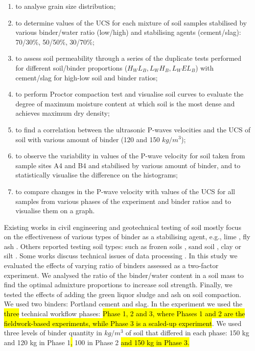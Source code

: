 \documentclass{amestyle}
\begin{document}
\begin{enumerate}
   \item to analyse grain size distribution;
   \item to determine values of the UCS for each mixture of soil samples stabilised by various binder/water ratio (low/high) and stabilising agents (cement/slag): 70/30\%, 50/50\%, 30/70\%; 
  \item to assess soil permeability through a series of the duplicate tests performed for different soil/binder proportions ($H_WL_B,L_WH_B,L_WEL_B$) with cement/slag for high-low soil and binder ratios;
  \item to perform Proctor compaction test and visualise soil curves to evaluate the degree of maximum moisture content at which soil is the most dense and achieves maximum dry density;
  \item to find a correlation between the ultrasonic P-waves velocities and the UCS of soil with various amount of binder (120 and 150 $kg/m^3$);
  \item to observe the variability in values of the P-wave velocity for soil taken from sample sites A4 and B4 and stabilised by various amount of binder, and to statistically visualise the difference on the histograms;
  \item to compare changes in the P-wave velocity with values of the UCS for all samples from various phases of the experiment and binder ratios and to visualise them on a graph.
\end{enumerate}

Existing works in civil engineering and geotechnical testing of soil mostly focus on the effectiveness of various types of binder as a stabilising agent, e.g., lime \cite{Rao,Mukhtar,Swaidani}, fly ash \cite{Phetchuay}. Others reported testing soil types: such as frozen soils \cite{Lemenkov2021b,Lemenkov2021c}, sand soil \cite{Robertson}, clay or silt \cite{Komal}. Some works discuss technical issues of data processing \cite{Kaellenetal2014,Lemenkov2021c}. In this study we evaluated the effects of varying ratio of binders assessed as a two-factor experiment. We analysed the ratio of the binder/water content in a soil mass to find the optimal admixture proportions to increase soil strength. Finally, we tested the effects of adding the green liquor sludge and ash on soil compaction. We used two binders: Portland cement and slag. In the experiment we used the \hl{three} technical workflow phases: \hl{Phase 1, 2 and 3, where Phases 1 and 2 are the fieldwork-based experiments, while Phase 3 is a scaled-up experiment}. We used three levels of binder quantity in $kg/m^3$ of soil that differed in each phase: 150 kg and 120 kg in Phase 1\hl{,} 100 in Phase 2 \hl{and 150 kg in Phase 3.}
\end{document}
